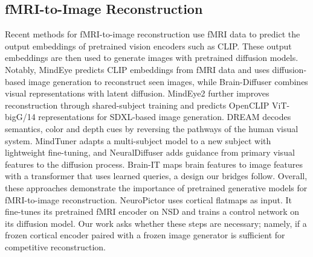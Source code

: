\documentclass[conference]{IEEEtran}
\begin{document}
\subsection{fMRI-to-Image Reconstruction}
Recent methods for fMRI-to-image reconstruction use fMRI data to predict the output embeddings of pretrained vision encoders such as CLIP. These output embeddings are then used to generate images with pretrained diffusion models. Notably, MindEye \cite{scotti2023reconstructingmindseyefmritoimage} predicts CLIP embeddings from fMRI data and uses diffusion-based image generation to reconstruct seen images, while Brain-Diffuser \cite{ozcelik2023brain} combines visual representations with latent diffusion. MindEye2 further improves reconstruction through shared-subject training and predicts OpenCLIP ViT-bigG/14 representations \cite{schuhmann2022laionb, ilharco_gabriel_2021_5143773} for SDXL-based image generation. DREAM \cite{xia2024dreamvisualdecodingreversing} decodes semantics, color and depth cues by reversing the pathways of the human visual system. MindTuner \cite{gong2024mindtunercrosssubjectvisualdecoding} adapts a multi-subject model to a new subject with lightweight fine-tuning, and NeuralDiffuser \cite{Li_2025} adds guidance from primary visual features to the diffusion process. Brain-IT \cite{beliy2025brainitimagereconstructionfmri} maps brain features to image features with a transformer that uses learned queries, a design our bridges follow. Overall, these approaches demonstrate the importance of pretrained generative models for fMRI-to-image reconstruction. NeuroPictor \cite{huo2024neuropictorrefiningfmritoimagereconstruction} uses cortical flatmaps as input. It fine-tunes its pretrained fMRI encoder on NSD and trains a control network on its diffusion model. Our work asks whether these steps are necessary; namely, if a frozen cortical encoder paired with a frozen image generator is sufficient for competitive reconstruction.
\end{document}
